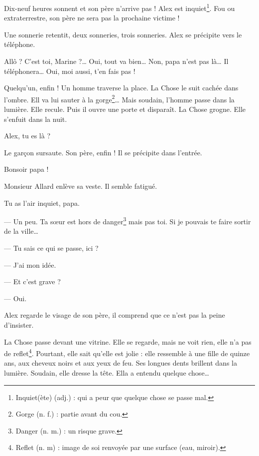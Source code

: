Dix-neuf heures sonnent et son père n'arrive pas ! Alex est inquiet\footnote{Inquiet(ète) (adj.) : qui a peur que quelque chose se
passe mal.}. Fou ou extraterrestre, son père ne sera pas la prochaine victime !

Une sonnerie retentit, deux sonneries, trois sonneries. Alex se précipite vers le téléphone.

\og Allô ? C'est toi, Marine ?\ldots{} Oui, tout va bien\ldots{} Non, papa n'est pas là\ldots{} Il téléphonera\ldots{} Oui, moi
aussi, t'en fais pas ! \fg{}

Quelqu'un, enfin ! Un homme traverse la place. La Chose le suit cachée dans l'ombre. Ell va lui sauter à la gorge\footnote{Gorge
(n. f.) : partie avant du cou.}\ldots{} Mais soudain, l'homme passe dans la lumière. Elle recule. Puis il ouvre une porte et
disparaît. La Chose grogne. Elle s'enfuit dans la nuit.

\og Alex, tu es là ? \fg{}

Le gar\c{c}on sursaute. Son père, enfin ! Il se précipite dans l'entrée.

\og Bonsoir papa ! \fg{}

Monsieur Allard enlève sa veste. Il semble fatigué.

\og Tu as l'air inquiet, papa.

--- Un peu. Ta s\oe{}ur est hors de danger\footnote{Danger (n. m.) : un risque grave.} mais pas toi. Si je pouvais te faire sortir
    de la ville\ldots{}

--- Tu sais ce qui se passe, ici ?

--- J'ai mon idée.

--- Et c'est grave ?

--- Oui. \fg{}

Alex regarde le visage de son père, il comprend que ce n'est pas la peine d'insister.

La Chose passe devant une vitrine. Elle se regarde, mais ne voit rien, elle n'a pas de reflet\footnote{Reflet (n. m) : image de
soi renvoyée par une surface (eau, miroir).}. Pourtant, elle sait qu'elle est jolie : elle ressemble à une fille de quinze ans,
aux cheveux noirs et aux yeux de feu. Ses longues dents brillent dans la lumière. Soudain, elle dresse la tête. Ella a entendu
quelque chose\ldots{}
